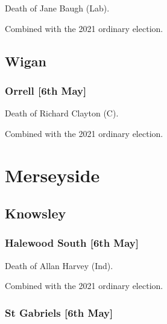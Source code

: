 \documentclass[a4paper,openany]{book}
\begin{document}
\begin{resultsiii}
Death of Jane Baugh (Lab).

Combined with the 2021 ordinary election.

\subsection*{Wigan}

\subsubsection*{Orrell \hspace*{\fill}\nolinebreak[1]%
	\enspace\hspace*{\fill}
	[6th May]}


Death of Richard Clayton (C).

Combined with the 2021 ordinary election.

\section{Merseyside}

\subsection*{Knowsley}

\subsubsection*{Halewood South \hspace*{\fill}\nolinebreak[1]%
	\enspace\hspace*{\fill}
	[6th May]}


Death of Allan Harvey (Ind).

Combined with the 2021 ordinary election.

\subsubsection*{St Gabriels \hspace*{\fill}\nolinebreak[1]%
	\enspace\hspace*{\fill}
	[6th May]}



\end{resultsiii}
\end{document}
